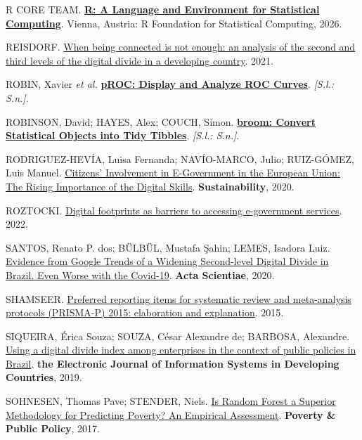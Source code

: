\documentclass[
  man,
  floatsintext,
  longtable,
  a4paper,
  nolmodern,
  notxfonts,
  notimes,
  colorlinks=true,linkcolor=blue,citecolor=blue,urlcolor=blue]{apa7}
\newlength{\cslhangindent}
\newenvironment{CSLReferences}[2] %
 {\begin{list}{}{%
  \setlength{\itemindent}{0pt}
  \setlength{\leftmargin}{0pt}
  \setlength{\parsep}{0pt}
  \ifodd #1
   \setlength{\leftmargin}{\cslhangindent}
   \setlength{\itemindent}{-1\cslhangindent}
  \fi
  \setlength{\itemsep}{#2\baselineskip}}}
 {\end{list}}
\begin{document}
\begin{CSLReferences}{0}{1}
R CORE TEAM. \textbf{\href{https://www.R-project.org/}{R: A Language and
Environment for Statistical Computing}}. Vienna, Austria: R Foundation
for Statistical Computing, 2026.

REISDORF. \href{https://doi.org/10.5325/jinfopoli.11.2021.0104}{When
being connected is not enough: an analysis of the second and third
levels of the digital divide in a developing country}. 2021.

ROBIN, Xavier \emph{et al.}
\textbf{\href{https://xrobin.github.io/pROC/}{pROC: Display and Analyze
ROC Curves}}. \emph{{[}S.l.: S.n.{]}}.

ROBINSON, David; HAYES, Alex; COUCH, Simon.
\textbf{\href{https://broom.tidymodels.org/}{broom: Convert Statistical
Objects into Tidy Tibbles}}. \emph{{[}S.l.: S.n.{]}}.

RODRIGUEZ-HEVÍA, Luisa Fernanda; NAVÍO-MARCO, Julio; RUIZ-GÓMEZ, Luis
Manuel. \href{https://doi.org/10.3390/su12176807}{Citizens' Involvement
in E-Government in the European Union: The Rising Importance of the
Digital Skills}. \textbf{Sustainability}, 2020.

ROZTOCKI. \href{https://doi.org/10.1111/1758-5899.13140}{Digital
footprints as barriers to accessing e-government services}. 2022.

SANTOS, Renato P. dos; BÜLBÜL, Mustafa Şahin; LEMES, Isadora Luiz.
\href{https://doi.org/10.17648/acta.scientiae.6006}{Evidence from Google
Trends of a Widening Second-level Digital Divide in Brazil. Even Worse
with the Covid-19}. \textbf{Acta Scientiae}, 2020.

SHAMSEER. \href{https://doi.org/10.1136/bmj.g7647}{Preferred reporting
items for systematic review and meta-analysis protocols (PRISMA-P) 2015:
elaboration and explanation}. 2015.

SIQUEIRA, Érica Souza; SOUZA, César Alexandre de; BARBOSA, Alexandre.
\href{https://doi.org/10.1002/isd2.12088}{Using a digital divide index
among enterprises in the context of public policies in Brazil}.
\textbf{the Electronic Journal of Information Systems in Developing
Countries}, 2019.

SOHNESEN, Thomas Pave; STENDER, Niels.
\href{https://doi.org/10.1002/pop4.169}{Is Random Forest a Superior
Methodology for Predicting Poverty? An Empirical Assessment}.
\textbf{Poverty \& Public Policy}, 2017.


\end{CSLReferences}
\end{document}
